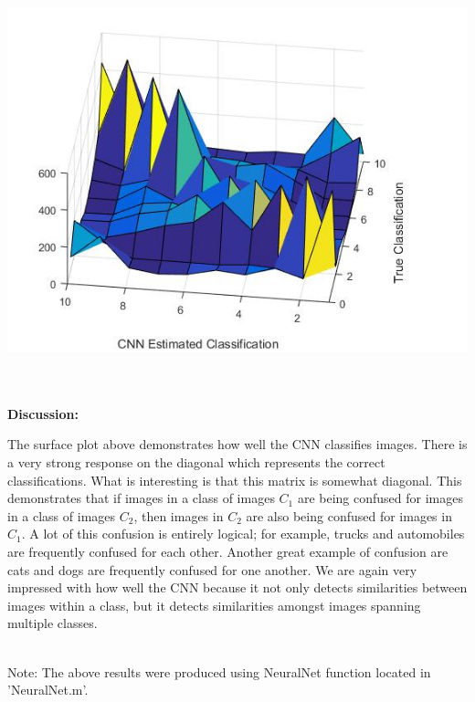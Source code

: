 \documentclass[11pt,english]{article}
\begin{document}
\begin{center}
	\includegraphics[scale=0.6]{confsurf}
	~\\~\\
\end{center}
\textbf{Discussion:}

	
   The surface plot above demonstrates how well the CNN classifies images. There is a very strong response on the diagonal which represents the correct classifications. What is interesting is that this matrix is somewhat diagonal. This demonstrates that if images in a class of images $C_1$ are being confused for images in a class of images $C_2$, then images in $C_2$ are also being confused for images in $C_1$. A lot of this confusion is entirely logical; for example, trucks and automobiles are frequently confused for each other. Another great example of confusion are cats and dogs are frequently confused for one another. We are again very impressed with how well the CNN because it not only detects similarities between images within a class, but it detects similarities amongst images spanning multiple classes.
       
    ~\\
    \noindent
    Note: The above results were produced using NeuralNet function located in 'NeuralNet.m'.
\end{document}
